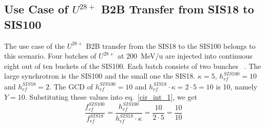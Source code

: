 
\subsection{Use Case of $U^{28+}$ B2B Transfer from SIS18 to SIS100}
\label{sec:cir_no_int}
The use case of the $U^{28+}$ B2B transfer from the SIS18 to the SIS100 belongs to this scenario. Four batches of $U^{28+}$ at \SI{200}{MeV/\atomicmassunit} are injected into continuous eight out of ten buckets of the SIS100. Each batch consists of two bunches ~\cite{liebermann_fair_2013, liebermann_sis100_2013}. The large synchrotron is the SIS100 and the small one the SIS18. $\kappa=5$, $h^{\mathit{SIS100}}_\mathit{rf}=10$ and $h^{\mathit{SIS18}}_\mathit{rf}=2$. %
The GCD of $h^{\mathit{SIS100}}_\mathit{rf}=10$ and $h^{\mathit{SIS18}}_\mathit{rf} \cdot \kappa=2\cdot 5=10$ is 10, namely $Y=10$. Substituting these values into eq.~\ref{cir_int_1}, we get
\begin{equation}
\frac{f_{\mathit{rf}}^{\mathit{SIS100}}}{f_{\mathit{rf}}^{\mathit{SIS18}}}= \frac {h^{\mathit{SIS100}}_\mathit{rf}}{h^{\mathit{SIS18}}_\mathit{rf} \cdot \kappa}= \frac{10}{2 \cdot 5}=\frac{10}{10}
\end{equation}

